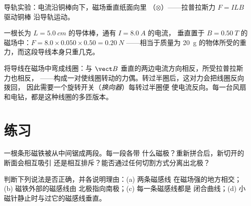 \begin{omfigure}

{\small 导轨实验：电流沿铜棒向下，磁场垂直纸面向里
（$\otimes$）——拉普拉斯力 $F = ILB$ 驱动铜棒
沿导轨运动。}
\end{omfigure}

\begin{example}[拉普拉斯力的数值]\label{ex:g11:magnetic-fields:laplace}
一根长为 $L = \qty{5.0}{cm}$ 的导体棒，通有 $I = \qty{8.0}{A}$ 的电流，
垂直置于 $B = \qty{0.50}{T}$ 的磁场中：$F = 8.0 \times 0.050 \times 0.50 = \qty{0.20}{N}$
——相当于质量为 \qty{20}{g} 的物体所受的重力，而这段导线本身只重几克。
\end{example}

\begin{remark}[直流电动机]\label{rem:g11:magnetic-fields:motor}
将导线在磁场中弯成线圈：与
$\vect B$ 垂直的两边电流方向相反，所受拉普拉斯力也相反，
——构成一对使线圈转动的力偶。转过半圈后，这对力会把线圈反向拨回，
因此需要一个旋转开关（\emph{换向器}）每转过半圈便
使电流反向。每一台风扇和电钻，都是这种线圈的多匝版本。
\end{remark}

\section{练习}

\begin{exercise}[$\star$]\label{exo:g11:magnetic-fields:1}
一根条形磁铁被从中间锯成两段。每一段各带
什么磁极？重新拼合后，新切开的断面会相互吸引
还是相互排斥？能否通过任何切割方式分离出北极？
\end{exercise}

\begin{exercise}[$\star$]\label{exo:g11:magnetic-fields:2}
判断下列说法是否正确，并各说明理由：(a) 两条磁感线
在磁场强的地方相交；(b) 磁铁外部的磁感线由
北极指向南极；(c) 每一条磁感线都是
闭合曲线；(d) 小磁针静止时与过它的磁感线垂直。
\end{exercise}

